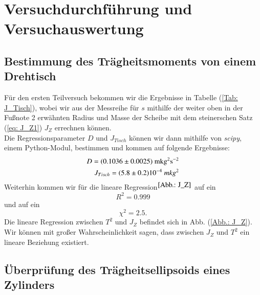 \documentclass[bibliography=totocnumbered]{scrartcl}
\begin{document}
	\section{Versuchdurchführung und Versuchauswertung}
	
	
	
	\subsection{Bestimmung des Trägheitsmoments von einem Drehtisch}
	
    
    
	Für den ersten Teilversuch bekommen wir die Ergebnisse in Tabelle (\ref{Tab: J_Tisch}), wobei wir aus der Messreihe für $ s $ mithilfe der weiter oben in der Fußnote 2 erwähnten Radius und Masse der Scheibe mit dem steinerschen Satz (\ref{eq: J_Z1}) $ J_{Z} $ errechnen können.\\
	Die Regressionsparameter $ D $ und $ J_{Tisch} $ können wir dann mithilfe von \textit{scipy}, einem Python-Modul, bestimmen und kommen auf folgende Ergebnisse:
	\begin{align}
		D=(0.1036\pm 0.0025)\text{ mkg$ ^{2} $s$ ^{-2} $}\\
		J_{Tisch}=(5.8\pm 0.2)10^{-4} \textit{ mkg$ ^{2} $}
	\end{align}                                
	Weiterhin kommen wir für die lineare Regression$ ^{\ref{Abb.: J_Z} } $ auf ein
	\begin{equation}\label{eq: R_sq_tisch}
		R^{2}=0.999
	\end{equation}
	und auf ein 
	\begin{equation}\label{eq: chi_sq_tisch}
		\chi^{2}=2.5.
	\end{equation}
    Die lineare Regression zwischen $ T^{2} $ und $ J_{Z} $ befindet sich in Abb. (\ref{Abb.: J_Z}).\\
    Wir können mit großer Wahrscheinlichkeit sagen, dass zwischen $ J_{Z} $ und $ T^{2} $ ein lineare Beziehung existiert.
    
    \newpage
    \subsection{Überprüfung des Trägheitsellipsoids eines Zylinders}
    
    
    
\end{document}
